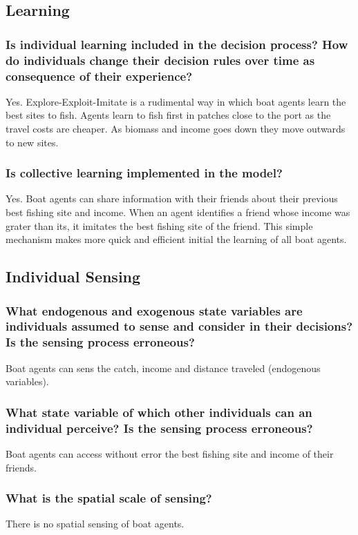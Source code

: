 \documentclass[11pt]{article}
\begin{document}
\subsection{Learning}
\label{sec:org8b17687}
\subsubsection{Is individual learning included in the decision process? How do individuals change their decision rules over time as consequence of their experience?}
\label{sec:orgf7e7575}
Yes. Explore-Exploit-Imitate is a rudimental way in which boat agents learn the best sites to fish. Agents learn to fish first in patches close to the port as the travel costs are cheaper. As biomass and income goes down they move outwards to new sites.
\subsubsection{Is collective learning implemented in the model?}
\label{sec:orgcadd8ad}
Yes. Boat agents can share information with their friends about their previous best fishing site and income. When an agent identifies a friend whose income was grater than its, it imitates the best fishing site of the friend. This simple mechanism makes more quick and efficient initial the learning of all boat agents.
\subsection{Individual Sensing}
\label{sec:org464fd18}
\subsubsection{What endogenous and exogenous state variables are individuals assumed to sense and consider in their decisions? Is the sensing process erroneous?}
\label{sec:org5506c70}
Boat agents can sens the catch, income and distance traveled (endogenous variables). 
\subsubsection{What state variable of which other individuals can an individual perceive? Is the sensing process erroneous?}
\label{sec:orgd19a80a}
Boat agents can access without error the best fishing site and income of their friends.
\subsubsection{What is the spatial scale of sensing?}
\label{sec:orgdf548ea}
There is no spatial sensing of boat agents.
\end{document}
